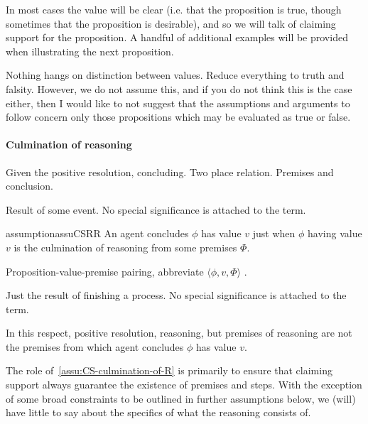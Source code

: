 \begin{note}
In most cases the value will be clear (i.e. that the proposition is true, though sometimes that the proposition is desirable), and so we will talk of claiming support for the proposition.
  A handful of additional examples will be provided when illustrating the next proposition.
\end{note}

\begin{note}
  Nothing hangs on distinction between values.
  Reduce everything to truth and falsity.
  However, we do not assume this, and if you do not think this is the case either, then I would like to not suggest that the assumptions and arguments to follow concern only those propositions which may be evaluated as true or false.
\end{note}

\paragraph{Culmination of reasoning}

\begin{note}
  Given the positive resolution, concluding.
  Two place relation.
  Premises and conclusion.

  Result of some event.
  No special significance is attached to the term.

  \begin{restatable}{assumption}{assuCSRR}
    \label{assu:CS-culmination-of-R}
    An agent concludes \(\phi\) has value \(v\) just when \(\phi\) having value \(v\) is the culmination of reasoning from some premises \(\Phi\).
  \end{restatable}

  \begin{notation}
    Proposition-value-premise pairing, abbreviate \(\langle \phi,v,\Phi \rangle\) .
  \end{notation}

  Just the result of finishing a process.
  No special significance is attached to the term.

  In this respect, positive resolution, reasoning, but premises of reasoning are not the premises from which agent concludes \(\phi\) has value \(v\).
\end{note}

\begin{note}
  The role of~\autoref{assu:CS-culmination-of-R} is primarily to ensure that claiming support always guarantee the existence of premises and steps.
  With the exception of some broad constraints to be outlined in further assumptions below, we (will) have little to say about the specifics of what the reasoning consists of.
\end{note}

